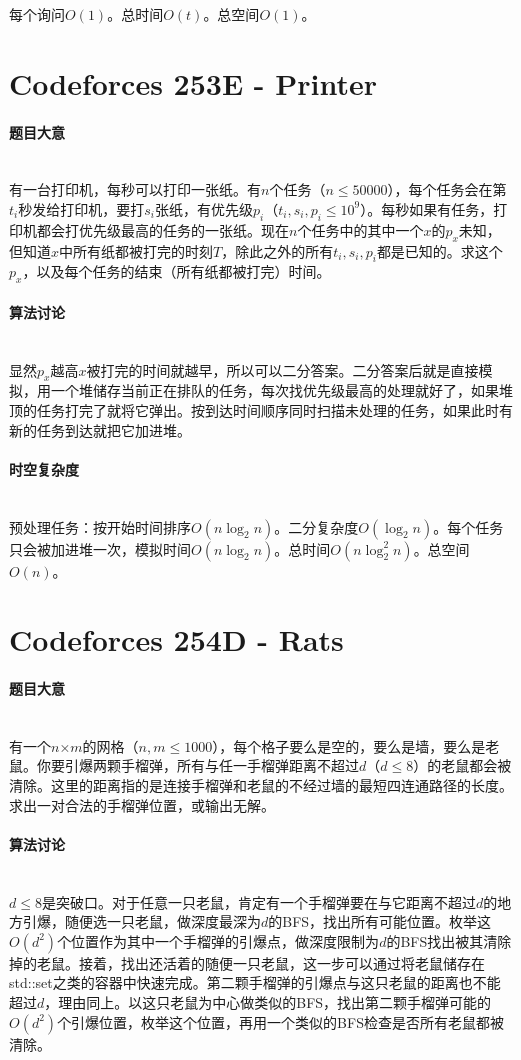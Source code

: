 \documentclass[UTF8]{ctexart}
\newcommand{\myparagraph}[1]{\paragraph{#1}\mbox{}\\}
\theoremstyle{nonumberplain}
\begin{document}
			每个询问$O(1)$。总时间$O(t)$。总空间$O(1)$。
	
	\section{Codeforces 253E - Printer}
	
		\myparagraph{题目大意}
		
			有一台打印机，每秒可以打印一张纸。有$n$个任务（$n \leq 50000$），每个任务会在第$t_i$秒发给打印机，要打$s_i$张纸，有优先级$p_i$（$t_i,s_i,p_i \leq 10^9$）。每秒如果有任务，打印机都会打优先级最高的任务的一张纸。现在$n$个任务中的其中一个$x$的$p_x$未知，但知道$x$中所有纸都被打完的时刻$T$，除此之外的所有$t_i,s_i,p_i$都是已知的。求这个$p_x$，以及每个任务的结束（所有纸都被打完）时间。
		
		\myparagraph{算法讨论}
		
			显然$p_x$越高$x$被打完的时间就越早，所以可以二分答案。二分答案后就是直接模拟，用一个堆储存当前正在排队的任务，每次找优先级最高的处理就好了，如果堆顶的任务打完了就将它弹出。按到达时间顺序同时扫描未处理的任务，如果此时有新的任务到达就把它加进堆。
		
		\myparagraph{时空复杂度}
		
			预处理任务：按开始时间排序$O(n\log_2n)$。二分复杂度$O(\log_2n)$。每个任务只会被加进堆一次，模拟时间$O(n\log_2n)$。总时间$O(n\log_2^2n)$。总空间$O(n)$。
	
	\section{Codeforces 254D - Rats}
	
		\myparagraph{题目大意}
		
			有一个$n$×$m$的网格（$n,m \leq 1000$），每个格子要么是空的，要么是墙，要么是老鼠。你要引爆两颗手榴弹，所有与任一手榴弹距离不超过$d$（$d \leq 8$）的老鼠都会被清除。这里的距离指的是连接手榴弹和老鼠的不经过墙的最短四连通路径的长度。求出一对合法的手榴弹位置，或输出无解。
		
		\myparagraph{算法讨论}
		
			$d \leq 8$是突破口。对于任意一只老鼠，肯定有一个手榴弹要在与它距离不超过$d$的地方引爆，随便选一只老鼠，做深度最深为$d$的BFS，找出所有可能位置。枚举这$O(d^2)$个位置作为其中一个手榴弹的引爆点，做深度限制为$d$的BFS找出被其清除掉的老鼠。接着，找出还活着的随便一只老鼠，这一步可以通过将老鼠储存在std::set之类的容器中快速完成。第二颗手榴弹的引爆点与这只老鼠的距离也不能超过$d$，理由同上。以这只老鼠为中心做类似的BFS，找出第二颗手榴弹可能的$O(d^2)$个引爆位置，枚举这个位置，再用一个类似的BFS检查是否所有老鼠都被清除。
		
\end{document}
